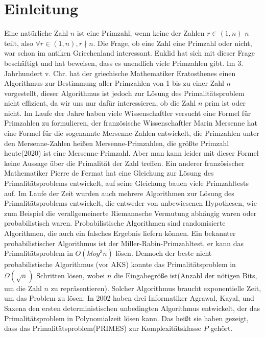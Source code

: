 \documentclass[12pt,oneside]{article}
\theoremstyle{remark}
\theoremstyle{definition}
\begin{document}
\section{Einleitung} \label{einleitung}
Eine natürliche Zahl $n$ ist eine Primzahl, wenn keine der Zahlen $r \in (1,n)$ $n$ teilt, also $\forall r \in (1,n), r \nmid n$. Die Frage, ob eine Zahl eine Primzahl oder nicht, war schon im antiken Griechenland interessant. Euklid hat sich mit dieser Frage beschäftigt und hat beweisen, dass es unendlich viele Primzahlen gibt. Im 3. Jahrhundert v. Chr. hat der griechische Mathematiker Eratosthenes einen Algorithmus zur Bestimmung aller Primzahlen von 1 bis zu einer Zahl $n $ vorgestellt, dieser Algorithmus ist jedoch zur Lösung des Primalitätsproblem nicht effizient, da wir uns nur dafür interessieren, ob die Zahl $n$ prim ist oder nicht. Im Laufe der Jahre haben viele Wissenschaftler versucht eine Formel für Primzahlen zu formulieren, der französische Wissenschaftler Marin Mersenne hat eine Formel für die sogenannte Mersenne-Zahlen entwickelt, die Primzahlen unter den Mersenne-Zahlen heißen Mersenne-Primzahlen, die größte Primzahl heute(2020) ist eine Mersenne-Primzahl. Aber man kann leider mit dieser Formel keine Aussage über die Primalität der Zahl treffen. Ein anderer französischer Mathematiker Pierre de Fermat hat eine Gleichung zur Lösung des Primalitätsproblems entwickelt, auf seine Gleichung bauen viele Primzahltests auf. \newline\newline
Im Laufe der Zeit wurden auch mehrere Algorithmen zur Lösung des Primalitätsproblems entwickelt, die entweder von unbewiesenen Hypothesen, wie zum Beispiel die verallgemeinerte Riemannsche Vermutung abhängig waren oder probabilistisch waren. Probabilistische Algorithmen sind randomisierte Algorithmen, die auch ein falsches Ergebnis liefern können. Ein bekannter probabilistischer Algorithmus ist der Miller-Rabin-Primzahltest, er kann das Primalitätsproblem in $O(k log^3 n)$ lösen. Dennoch der beste nicht probabilistische Algorithmus (vor AKS) konnte das Primalitätsproblem in $ \Omega(\sqrt{n}) $ Schritten lösen, wobei $n$ die Eingabegröße ist(Anzahl der nötigen Bits, um die Zahl $n$ zu repräsentieren). Solcher Algorithmus braucht exponentielle Zeit, um das Problem zu lösen. In 2002 haben drei Informatiker Agrawal, Kayal, und Saxena den ersten deterministischen unbedingten Algorithmus entwickelt, der das Primalitätsproblem in Polynomialzeit lösen kann. Das heißt sie haben gezeigt, dass das Primalitätsproblem(PRIMES) zur Komplexitätsklasse $P$ gehört. \newline
\end{document}
